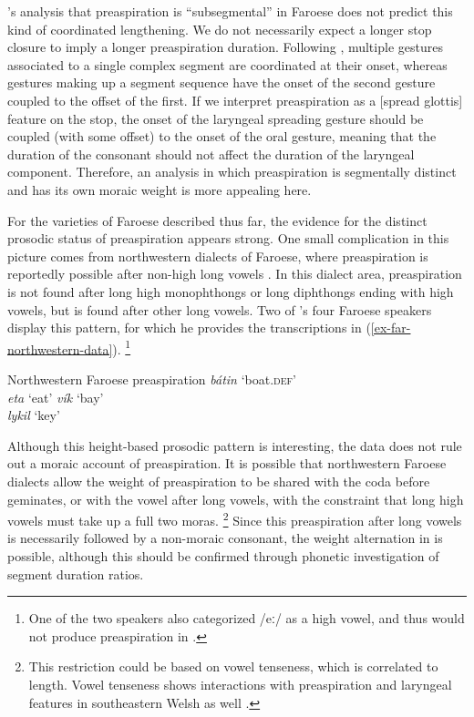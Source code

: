 \documentclass[output=paper,colorlinks,citecolor=brown]{langscibook}
\begin{document}
\citeauthor{arnason2011}'s analysis that preaspiration is ``subsegmental'' in Faroese does not predict this kind of coordinated lengthening. We do not necessarily expect a longer stop closure to imply a longer preaspiration duration. Following \citet{shawetal2021}, multiple gestures associated to a single complex segment are coordinated at their onset, whereas gestures making up a segment sequence have the onset of the second gesture coupled to the offset of the first. If we interpret preaspiration as a [spread glottis] feature on the stop, the onset of the laryngeal spreading gesture should be coupled (with some offset) to the onset of the oral gesture, meaning that the duration of the consonant should not affect the duration of the laryngeal component. Therefore, an analysis in which preaspiration is segmentally distinct and has its own moraic weight is more appealing here.
	
For the varieties of Faroese described thus far, the evidence for the distinct prosodic status of preaspiration appears strong. One small complication in this picture comes from northwestern dialects of Faroese, where preaspiration is reportedly possible after non-high long vowels \citep{Helgason2002}. In this dialect area, preaspiration is not found after long high monophthongs or long diphthongs ending with high vowels, but is found after other long vowels. Two of \citeauthor{Helgason2002}'s four Faroese speakers display this pattern, for which he provides the transcriptions in (\ref{ex-far-northwestern-data}).%
\footnote{One of the two speakers also categorized /eː/ as a high vowel, and thus would not produce preaspiration in  .}

\vbox{
\ea Northwestern Faroese preaspiration \citep[57]{Helgason2002}
\label{ex-far-northwestern-data}
	\ea  {}
	     \textit{bátin}		\tab\relax [bɔ̟͡ɐːht̪ən]	\tab `boat.\textsc{def}'\\
		 \textit{eta} 		\tab\relax [eːht̪a]	    \tab `eat'	
	\ex	 \textit{vík}		\tab\relax [vʊ͡iːkʰ]	    \tab `bay'\\
		 \textit{lykil}		\tab\relax [liːtʃɘl]	\tab `key' 	
	\z
\z
}

Although this height-based prosodic pattern is interesting, the data does not rule out a moraic account of preaspiration.  It is possible that northwestern Faroese dialects allow the weight of preaspiration to be shared with the coda before geminates, or with the vowel after long vowels, with the constraint that long high vowels must take up a full two moras.%
\footnote{This restriction could be based on vowel tenseness, which is correlated to length. Vowel tenseness shows interactions with preaspiration and laryngeal features in southeastern Welsh as well \citep{iosad2023}.}
Since this preaspiration after long vowels is necessarily followed by a non-moraic consonant, the weight alternation in  is possible, although this should be confirmed through phonetic investigation of segment duration ratios. 
\end{document}
